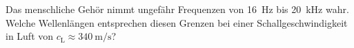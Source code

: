 \begin{ExerciseBlock}
Das menschliche Gehör nimmt ungefähr Frequenzen von \qty{16}{\hertz} bis \qty{20}{\kilo\hertz} wahr. Welche Wellenlängen entsprechen diesen Grenzen bei einer Schallgeschwindigkeit in Luft von $c_\mathrm L\approx\qty{340}{\metre\per\second}$?
\end{ExerciseBlock}
